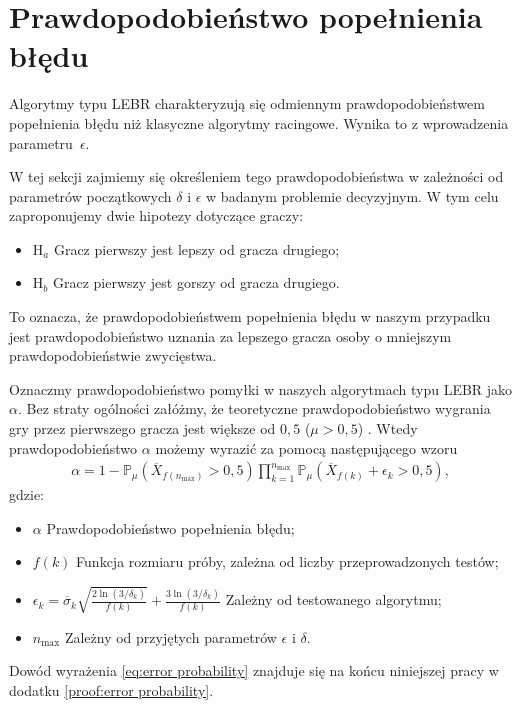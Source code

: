 \documentclass[inzynierska]{pwr_wmat_praca_dyplomowa}
\theoremstyle{plain}
\numberwithin{theorem}{chapter}
\theoremstyle{definition}
\numberwithin{theorem}{chapter}
\newcommand{\probP}{\mathbb{P}}
\newcommand{\nmax}{n_{\text{max}}}
\begin{document}
	\section{Prawdopodobieństwo popełnienia błędu}
		Algorytmy typu LEBR charakteryzują się odmiennym prawdopodobieństwem popełnienia błędu niż klasyczne algorytmy racingowe. Wynika to z wprowadzenia parametru~$\epsilon$.
		
		W tej sekcji zajmiemy się określeniem tego prawdopodobieństwa w zależności od parametrów początkowych $\delta$ i $\epsilon$ w badanym problemie decyzyjnym. W tym celu zaproponujemy dwie hipotezy dotyczące graczy:
	\begin{itemize}
		\item $\text{H}_a$ \pauza Gracz pierwszy jest lepszy od gracza drugiego;
		\item  $\text{H}_b$ \pauza Gracz pierwszy jest gorszy od gracza drugiego.
	\end{itemize}
	To oznacza, że prawdopodobieństwem popełnienia błędu w naszym przypadku jest prawdopodobieństwo uznania za lepszego gracza osoby o mniejszym prawdopodobieństwie zwycięstwa.
	
	Oznaczmy prawdopodobieństwo pomyłki w naszych algorytmach typu LEBR jako $\alpha$. Bez straty ogólności załóżmy, że teoretyczne prawdopodobieństwo wygrania gry przez pierwszego gracza jest większe od $0,5$ ($\mu > 0,5$)%
	. Wtedy prawdopodobieństwo $\alpha$ możemy wyrazić za pomocą następującego wzoru
	\begin{gather}
		\label{eq:error probability}
		\alpha = 1 - \probP_{\mu}(\overline{X}_{f(\nmax)} > 0,5)
 \prod^{\nmax}_{k=1} \probP_{\mu}(\overline{X}_{f(k)} +  \epsilon_{k} > 0,5),
	\end{gather}
	gdzie:
	\begin{itemize}
		\item $\alpha$ \pauza Prawdopodobieństwo popełnienia błędu;
		\item $f(k)$ \pauza Funkcja rozmiaru próby, zależna od liczby przeprowadzonych testów;
		\item $\epsilon_k = \overline{\sigma}_k \sqrt{\frac{2\ln(3/\delta_k)}{f(k)}}+\frac{3\ln(3/\delta_k)}{f(k)}$ \pauza Zależny od testowanego algorytmu;
		\item $\nmax$ \pauza Zależny od przyjętych parametrów $\epsilon$ i $\delta$.
	\end{itemize}
	Dowód wyrażenia \eqref{eq:error probability} znajduje się na końcu niniejszej pracy w dodatku \ref{proof:error probability}.
	
\end{document}
